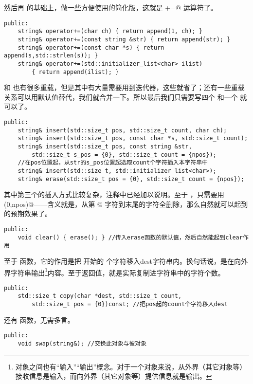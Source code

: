 然后再 \lstinline@append@ 的基础上，做一些方便使用的简化版，这就是 \lstinline@operator+=@ 运算符了。
\begin{lstlisting}
public:
    string& operator+=(char ch) { return append(1, ch); }
    string& operator+=(const string &str) { return append(str); }
    string& operator+=(const char *s) { return append(s,std::strlen(s)); }
    string& operator+=(std::initializer_list<char> ilist)
        { return append(ilist); }
\end{lstlisting}\par
\lstinline@insert@ 和 \lstinline@erase@ 也有很多重载，但是其中有大量需要用到迭代器，这些就省了；还有一些重载关系可以用默认值替代，我们就合并一下。所以最后我们只需要写四个 \lstinline@insert@ 和一个 \lstinline@erase@ 就可以了。
\begin{lstlisting}
public:
    string& insert(std::size_t pos, std::size_t count, char ch);
    string& insert(std::size_t pos, const char *s, std::size_t count);
    string& insert(std::size_t pos, const string &str,
        std::size_t s_pos = {0}, std::size_t count = {npos});
    //在pos位置起，从str的s_pos位置起选取count个字符插入本字符串中
    string& insert(std::size_t, std::initializer_list<char>);
    string& erase(std::size_t pos = {0}, std::size_t count = {npos});
\end{lstlisting}
其中第三个的插入方式比较复杂，注释中已经加以说明。至于 \lstinline@clear@，只需要用 \lstinline@erase(0,npos)@——含义就是，从第 @ 字符到末尾的字符全删除，那么自然就可以起到 \lstinline@clear@ 的预期效果了。
\begin{lstlisting}
public:
    void clear() { erase(); } //传入erase函数的默认值，然后自然能起到clear作用
\end{lstlisting}\par
至于 \lstinline@copy@ 函数，它的作用是把 \lstinline@pos@ 开始的 \lstinline@count@ 个字符移入dest字符串内。换句话说，是在向外界字符串输出\footnote{对象之间也有``输入''``输出''概念。对于一个对象来说，从外界（其它对象等）接收信息是输入，而向外界（其它对象等）提供信息就是输出。}内容。至于返回值，就是实际复制进字符串中的字符个数。
\begin{lstlisting}
public:
    std::size_t copy(char *dest, std::size_t count,
        std::size_t pos = {0})const; //把pos起的count个字符移入dest
\end{lstlisting}\par
\lstinline@swap@ 还有 \lstinline@swap@ 函数，无需多言。
\begin{lstlisting}
public:
    void swap(string&); //交换此对象与彼对象
\end{lstlisting}

